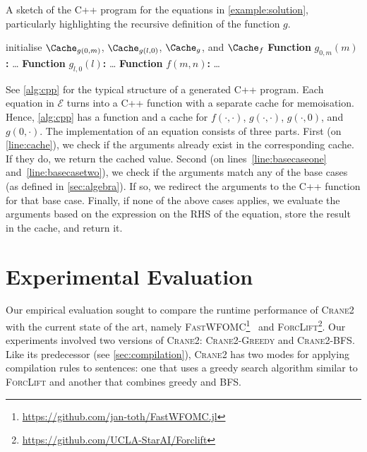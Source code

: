 \documentclass[a4paper,UKenglish,cleveref,autoref]{lipics-v2021}
\newcommand{\Cranetwo}{\textsc{Crane2}}
\newcommand{\Cranebfs}{\textsc{Crane2-BFS}}
\newcommand{\Cranegreedy}{\textsc{Crane2-Greedy}}
\begin{document}
\begin{algorithm}[t]
  \caption{A sketch of the C++ program for the equations in
    \cref{example:solution}, particularly highlighting the recursive definition
    of the function $g$.}\label{alg:cpp}
  initialise $\Cache_{g(0, m)}$, $\Cache_{g(l, 0)}$, $\Cache_{g}$, and
  $\Cache_{f}$\; \DontPrintSemicolon \textbf{Function} $g_{0,m}(m)$\textbf{:}
  \dots\; \textbf{Function} $g_{l,0}(l)$\textbf{:} \dots\; \PrintSemicolon
   \DontPrintSemicolon \textbf{Function} $f(m, n)$\textbf{:}
  \dots\; \PrintSemicolon {}
\end{algorithm}

See \cref{alg:cpp} for the typical structure of a generated C++ program. Each
equation in $\mathcal{E}$ turns into a C++ function with a separate cache for
memoisation. Hence, \cref{alg:cpp} has a function and a cache for
$f(\cdot, \cdot)$, $g(\cdot, \cdot)$, $g(\cdot, 0)$, and $g(0, \cdot)$. The
implementation of an equation consists of three parts. First (on
\autoref{line:cache}), we check if the arguments already exist in the
corresponding cache. If they do, we return the cached value. Second (on
lines~\ref{line:basecaseone} and~\ref{line:basecasetwo}), we check if the
arguments match any of the base cases (as defined in \cref{sec:algebra}). If so,
we redirect the arguments to the C++ function for that base case. Finally, if
none of the above cases applies, we evaluate the arguments based on the
expression on the RHS of the equation, store the result in the cache, and return
it.

\section{Experimental Evaluation}\label{sec:experiments}

Our empirical evaluation sought to compare the runtime performance of
{\Cranetwo} with the current state of the art, namely
\textsc{FastWFOMC}\footnote{\url{https://github.com/jan-toth/FastWFOMC.jl}}~\cite{DBLP:conf/kr/TothK24,DBLP:conf/uai/BremenK21}
and \textsc{ForcLift}\footnote{\url{https://github.com/UCLA-StarAI/Forclift}}.
Our experiments involved two versions of \Cranetwo{}: \Cranegreedy{} and
\Cranebfs{}. Like its predecessor (see \cref{sec:compilation}), \Cranetwo{} has
two modes for applying compilation rules to sentences: one that uses a greedy
search algorithm similar to \textsc{ForcLift} and another that combines greedy
and BFS\@.
\end{document}

